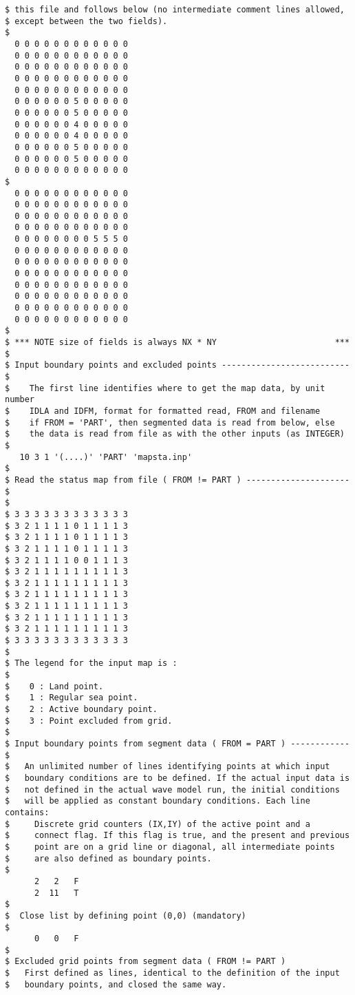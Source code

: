 \begin{footnotesize}
\begin{verbatim}
$ this file and follows below (no intermediate comment lines allowed,
$ except between the two fields).
$
  0 0 0 0 0 0 0 0 0 0 0 0
  0 0 0 0 0 0 0 0 0 0 0 0
  0 0 0 0 0 0 0 0 0 0 0 0
  0 0 0 0 0 0 0 0 0 0 0 0
  0 0 0 0 0 0 0 0 0 0 0 0
  0 0 0 0 0 0 5 0 0 0 0 0
  0 0 0 0 0 0 5 0 0 0 0 0
  0 0 0 0 0 0 4 0 0 0 0 0
  0 0 0 0 0 0 4 0 0 0 0 0
  0 0 0 0 0 0 5 0 0 0 0 0
  0 0 0 0 0 0 5 0 0 0 0 0
  0 0 0 0 0 0 0 0 0 0 0 0
$
  0 0 0 0 0 0 0 0 0 0 0 0
  0 0 0 0 0 0 0 0 0 0 0 0
  0 0 0 0 0 0 0 0 0 0 0 0
  0 0 0 0 0 0 0 0 0 0 0 0
  0 0 0 0 0 0 0 0 5 5 5 0
  0 0 0 0 0 0 0 0 0 0 0 0
  0 0 0 0 0 0 0 0 0 0 0 0
  0 0 0 0 0 0 0 0 0 0 0 0
  0 0 0 0 0 0 0 0 0 0 0 0
  0 0 0 0 0 0 0 0 0 0 0 0
  0 0 0 0 0 0 0 0 0 0 0 0
  0 0 0 0 0 0 0 0 0 0 0 0
$
$ *** NOTE size of fields is always NX * NY                        ***
$
$ Input boundary points and excluded points -------------------------- $
$    The first line identifies where to get the map data, by unit number
$    IDLA and IDFM, format for formatted read, FROM and filename
$    if FROM = 'PART', then segmented data is read from below, else
$    the data is read from file as with the other inputs (as INTEGER)
$
   10 3 1 '(....)' 'PART' 'mapsta.inp'
$
$ Read the status map from file ( FROM != PART ) --------------------- $
$
$ 3 3 3 3 3 3 3 3 3 3 3 3
$ 3 2 1 1 1 1 0 1 1 1 1 3
$ 3 2 1 1 1 1 0 1 1 1 1 3
$ 3 2 1 1 1 1 0 1 1 1 1 3
$ 3 2 1 1 1 1 0 0 1 1 1 3
$ 3 2 1 1 1 1 1 1 1 1 1 3
$ 3 2 1 1 1 1 1 1 1 1 1 3
$ 3 2 1 1 1 1 1 1 1 1 1 3
$ 3 2 1 1 1 1 1 1 1 1 1 3
$ 3 2 1 1 1 1 1 1 1 1 1 3
$ 3 2 1 1 1 1 1 1 1 1 1 3
$ 3 3 3 3 3 3 3 3 3 3 3 3
$
$ The legend for the input map is :
$
$    0 : Land point.
$    1 : Regular sea point.
$    2 : Active boundary point.
$    3 : Point excluded from grid.
$
$ Input boundary points from segment data ( FROM = PART ) ------------ $
$   An unlimited number of lines identifying points at which input
$   boundary conditions are to be defined. If the actual input data is
$   not defined in the actual wave model run, the initial conditions
$   will be applied as constant boundary conditions. Each line contains:
$     Discrete grid counters (IX,IY) of the active point and a
$     connect flag. If this flag is true, and the present and previous
$     point are on a grid line or diagonal, all intermediate points
$     are also defined as boundary points.
$
      2   2   F
      2  11   T
$
$  Close list by defining point (0,0) (mandatory)
$
      0   0   F
$
$ Excluded grid points from segment data ( FROM != PART )
$   First defined as lines, identical to the definition of the input
$   boundary points, and closed the same way.

\end{verbatim}
\end{footnotesize}
